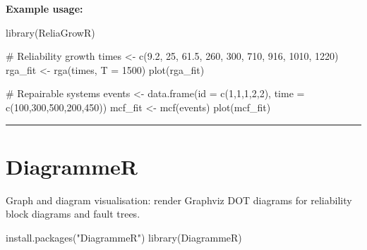 \documentclass[
  letterpaper,
  DIV=11,
  numbers=noendperiod]{scrreprt}
\newenvironment{Shaded}{\begin{snugshade}}{\end{snugshade}}
\newcommand{\AttributeTok}[1]{\textcolor[rgb]{0.40,0.45,0.13}{#1}}
\newcommand{\CommentTok}[1]{\textcolor[rgb]{0.37,0.37,0.37}{#1}}
\newcommand{\DecValTok}[1]{\textcolor[rgb]{0.68,0.00,0.00}{#1}}
\newcommand{\FloatTok}[1]{\textcolor[rgb]{0.68,0.00,0.00}{#1}}
\newcommand{\FunctionTok}[1]{\textcolor[rgb]{0.28,0.35,0.67}{#1}}
\newcommand{\NormalTok}[1]{\textcolor[rgb]{0.00,0.23,0.31}{#1}}
\newcommand{\OtherTok}[1]{\textcolor[rgb]{0.00,0.23,0.31}{#1}}
\newcommand{\StringTok}[1]{\textcolor[rgb]{0.13,0.47,0.30}{#1}}
\begin{document}
\textbf{Example usage:}

\begin{Shaded}
\begin{Highlighting}[]
\FunctionTok{library}\NormalTok{(ReliaGrowR)}

\CommentTok{\# Reliability growth}
\NormalTok{times }\OtherTok{\textless{}{-}} \FunctionTok{c}\NormalTok{(}\FloatTok{9.2}\NormalTok{, }\DecValTok{25}\NormalTok{, }\FloatTok{61.5}\NormalTok{, }\DecValTok{260}\NormalTok{, }\DecValTok{300}\NormalTok{, }\DecValTok{710}\NormalTok{, }\DecValTok{916}\NormalTok{, }\DecValTok{1010}\NormalTok{, }\DecValTok{1220}\NormalTok{)}
\NormalTok{rga\_fit }\OtherTok{\textless{}{-}} \FunctionTok{rga}\NormalTok{(times, }\AttributeTok{T =} \DecValTok{1500}\NormalTok{)}
\FunctionTok{plot}\NormalTok{(rga\_fit)}

\CommentTok{\# Repairable systems}
\NormalTok{events }\OtherTok{\textless{}{-}} \FunctionTok{data.frame}\NormalTok{(}\AttributeTok{id =} \FunctionTok{c}\NormalTok{(}\DecValTok{1}\NormalTok{,}\DecValTok{1}\NormalTok{,}\DecValTok{1}\NormalTok{,}\DecValTok{2}\NormalTok{,}\DecValTok{2}\NormalTok{), }\AttributeTok{time =} \FunctionTok{c}\NormalTok{(}\DecValTok{100}\NormalTok{,}\DecValTok{300}\NormalTok{,}\DecValTok{500}\NormalTok{,}\DecValTok{200}\NormalTok{,}\DecValTok{450}\NormalTok{))}
\NormalTok{mcf\_fit }\OtherTok{\textless{}{-}} \FunctionTok{mcf}\NormalTok{(events)}
\FunctionTok{plot}\NormalTok{(mcf\_fit)}
\end{Highlighting}
\end{Shaded}

\begin{center}\rule{0.5\linewidth}{0.5pt}\end{center}

\section*{DiagrammeR}\label{diagrammer}


Graph and diagram visualisation: render Graphviz DOT diagrams for
reliability block diagrams and fault trees.

\begin{Shaded}
\begin{Highlighting}[]
\FunctionTok{install.packages}\NormalTok{(}\StringTok{"DiagrammeR"}\NormalTok{)}
\FunctionTok{library}\NormalTok{(DiagrammeR)}
\end{Highlighting}
\end{Shaded}
\end{document}
